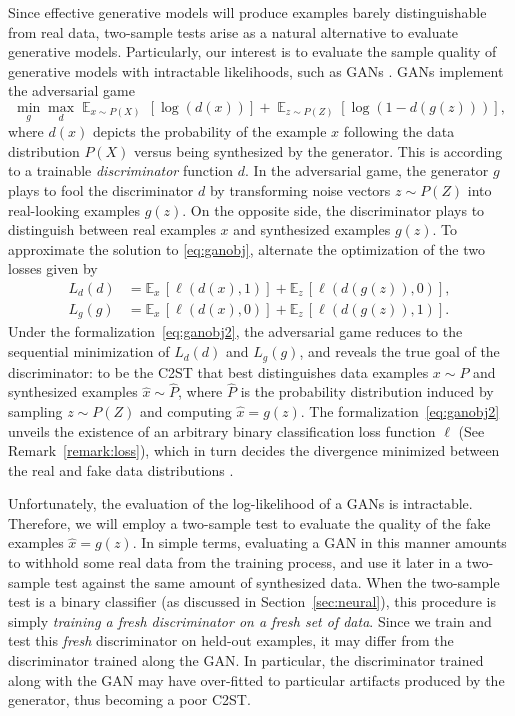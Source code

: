 \documentclass[a4paper]{article}
\DeclareMathOperator*{\E}{\mathbb{E}}
\begin{document}
  Since effective generative models will produce examples barely
  distinguishable from real data, two-sample tests arise as a natural
  alternative to evaluate generative models.
  Particularly, our interest is to evaluate the sample quality of
  generative models with intractable likelihoods, such as GANs
  \citep{goodfellow2014generative}.
  GANs implement the adversarial game
  \begin{equation}\label{eq:ganobj}
    \min_{g} \max_{d} \E_{x \sim P(X)}\, \left[\log(d(x))\right] + \E_{z \sim P(Z)} \left[\log(1-d(g(z)))\right],
  \end{equation}
  where $d(x)$ depicts the probability of the example $x$ 
  following the data distribution $P(X)$ versus being synthesized by the generator. This is
  according to a trainable \emph{discriminator} function $d$.
  In the adversarial game, the generator $g$ plays to fool the
  discriminator $d$ by transforming noise vectors $z \sim P(Z)$ into real-looking examples
  $g(z)$. On the opposite side, the discriminator
  plays to distinguish between real examples $x$ and synthesized examples $g(z)$.
  To approximate the solution to \eqref{eq:ganobj},
  alternate the optimization of the two losses \citep{goodfellow2014generative} given by
  \begin{align}
    L_d(d) &= \mathbb{E}_{x}\, \left[\ell(d(x), 1)\right] + \mathbb{E}_z\,  \left[ \ell(d(g(z)),0) \right],\nonumber\\
    L_g(g) &= \mathbb{E}_{x}\, \left[\ell(d(x), 0)\right] + \mathbb{E}_{z}\,\left[ \ell(d(g(z)),1) \right].\label{eq:ganobj2}
  \end{align}
  Under the formalization~\eqref{eq:ganobj2}, the adversarial game 
  reduces to the sequential minimization of $L_d(d)$ and $L_g(g)$, and reveals
  the true goal of the discriminator: to be the C2ST that
  best distinguishes data examples $x \sim P$ and synthesized examples $\hat{x}
  \sim \hat{P}$, where $\hat{P}$ is the probability distribution induced by
  sampling $z \sim P(Z)$ and computing $\hat{x} = g(z)$.  The
  formalization~\eqref{eq:ganobj2} unveils the existence of an arbitrary
  binary classification loss function $\ell$ (See Remark~\ref{remark:loss}),
  which in turn decides the divergence minimized between the real and fake
  data distributions \citep{nowozin2016f}.

  Unfortunately, the evaluation of the log-likelihood of a GANs is intractable. Therefore, we will employ a
  two-sample test to evaluate the quality of the fake examples $\hat{x} = g(z)$.
  In simple terms, evaluating a GAN in this
  manner amounts to withhold some real data from the training process, and use it later
  in a two-sample test against the same amount of synthesized
  data. When the two-sample test is a binary classifier (as discussed in
  Section~\ref{sec:neural}), this procedure is simply \emph{training a fresh
  discriminator on a fresh set of data}. Since we train and test this
  \emph{fresh} discriminator on held-out examples, it may differ from the
  discriminator trained along the GAN. In particular, the discriminator trained
  along with the GAN may have over-fitted to particular artifacts produced by
  the generator, thus becoming a poor C2ST.
\end{document}
